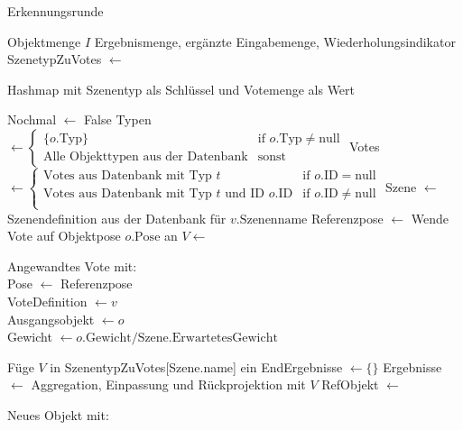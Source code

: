 \begin{algorithm}
  \caption{Erkennungsrunde}
  \small\label{algo:erkennung-runde}
  \begin{algorithmic}[1]
    \Require Objektmenge $I$\;
    \Ensure Ergebnismenge, ergänzte Eingabemenge, Wiederholungsindikator\;
    \State SzenetypZuVotes $\gets$ \parbox[t]{\dimexpr\linewidth-1\algorithmicindent\relax}{Hashmap mit Szenentyp als Schlüssel und Votemenge als Wert}\strut\;
    \State Nochmal $\gets$ False\;
      \State Typen $\gets \begin{cases}
          \{o.\text{Typ}\} & \text{if } o.\text{Typ} \neq \text{null}\\
          \text{Alle Objekttypen aus der Datenbank} & \text{sonst}
        \end{cases}$\;
          \State Votes $\gets \begin{cases}
                                \text{Votes aus Datenbank mit Typ } t & \text{if } o.\text{ID} = \text{null}\\
                                \text{Votes aus Datenbank mit Typ } t \text{ und ID } o.\text{ID} & \text{if } o.\text{ID} \neq \text{null}\\
                              \end{cases}$\;
            \State Szene $\gets$ Szenendefinition aus der Datenbank für $v.\text{Szenenname}$\;
            \State Referenzpose $\gets$ Wende Vote auf Objektpose $o.\text{Pose}$ an\;
            \State $V \gets $ \parbox[t]{\dimexpr\linewidth-1\algorithmicindent\relax}{Angewandtes Vote mit:\\
              Pose $\gets$ Referenzpose\\
              VoteDefinition $\gets v$\\
              Ausgangsobjekt $\gets o$\\
              Gewicht $\gets o.\text{Gewicht} / \text{Szene}.\text{ErwartetesGewicht}$ }\strut\;
            \State Füge $V$ in SzenentypZuVotes[Szene.name] ein\;
          \EndFor
        \EndFor
    \EndFor
    \State EndErgebnisse $\gets \{\}$\;
      \State Ergebnisse $\gets$ Aggregation, Einpassung und Rückprojektion mit $V$\;
          \State RefObjekt $\gets$ \parbox[t]{\dimexpr\linewidth-1\algorithmicindent\relax}{Neues Objekt mit:\\
}
\end{algorithmic}
\end{algorithm}
